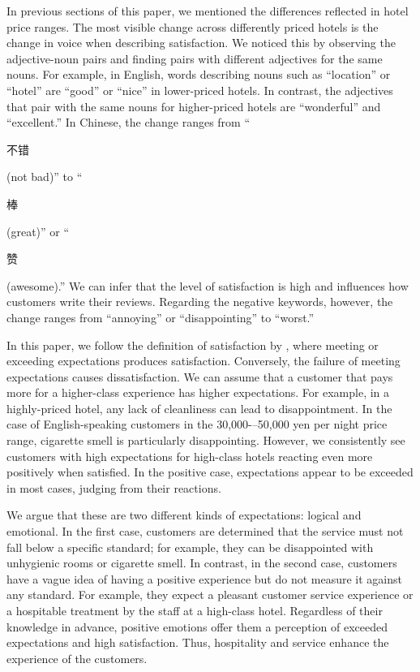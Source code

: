\documentclass[smallextended,natbib]{svjour3}       %
\begin{document}
    In previous sections of this paper, we mentioned the differences reflected in hotel price ranges. The most visible change across differently priced hotels is the change in voice when describing satisfaction. We noticed this by observing the adjective-noun pairs and finding pairs with different adjectives for the same nouns. For example, in English, words describing nouns such as ``location'' or ``hotel'' are ``good'' or ``nice'' in lower-priced hotels. In contrast, the adjectives that pair with the same nouns for higher-priced hotels are ``wonderful'' and ``excellent.'' In Chinese, the change ranges from ``\begin{CJK}{UTF8}{gbsn}不错\end{CJK} (not bad)'' to ``\begin{CJK}{UTF8}{gbsn}棒\end{CJK} (great)'' or ``\begin{CJK}{UTF8}{gbsn}赞\end{CJK} (awesome).'' We can infer that the level of satisfaction is high and influences how customers write their reviews. Regarding the negative keywords, however, the change ranges from ``annoying'' or ``disappointing'' to ``worst.''

    In this paper, we follow the definition of satisfaction by \cite{hunt1975}, where meeting or exceeding expectations produces satisfaction. Conversely, the failure of meeting expectations causes dissatisfaction. We can assume that a customer that pays more for a higher-class experience has higher expectations. For example, in a highly-priced hotel, any lack of cleanliness can lead to disappointment. In the case of English-speaking customers in the 30,000-–50,000 yen per night price range, cigarette smell is particularly disappointing. However, we consistently see customers with high expectations for high-class hotels reacting even more positively when satisfied. In the positive case, expectations appear to be exceeded in most cases, judging from their reactions. 

    We argue that these are two different kinds of expectations: logical and emotional. In the first case, customers are determined that the service must not fall below a specific standard; for example, they can be disappointed with unhygienic rooms or cigarette smell. In contrast, in the second case, customers have a vague idea of having a positive experience but do not measure it against any standard. For example, they expect a pleasant customer service experience or a hospitable treatment by the staff at a high-class hotel. Regardless of their knowledge in advance, positive emotions offer them a perception of exceeded expectations and high satisfaction. Thus, hospitality and service enhance the experience of the customers. 
\end{document}
